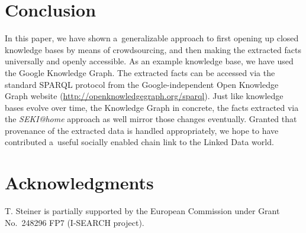 \documentclass[runningheads,a4paper]{llncs}
\begin{document}
\section{Conclusion} \label{sec:conclusion}
In this paper, we have shown a~generalizable approach
to first opening up closed knowledge bases by means of crowdsourcing,
and then making the extracted facts universally and openly accessible.
As an example knowledge base, we have used the Google Knowledge Graph.
The extracted facts can be accessed via the standard SPARQL protocol
from the Google-independent Open Knowledge Graph website
(\url{http://openknowledgegraph.org/sparql}).
Just like knowledge bases evolve over time, the Knowledge Graph in concrete,
the facts extracted via the \emph{SEKI@home} approach as well
mirror those changes eventually.
Granted that provenance of the extracted data is handled appropriately,
we hope to have contributed a~useful socially enabled chain link
to the Linked Data world.

\section*{Acknowledgments}
T. Steiner is partially supported by the European Commission
under Grant No.~248296 FP7 (\mbox{I-SEARCH} project).



\end{document}
